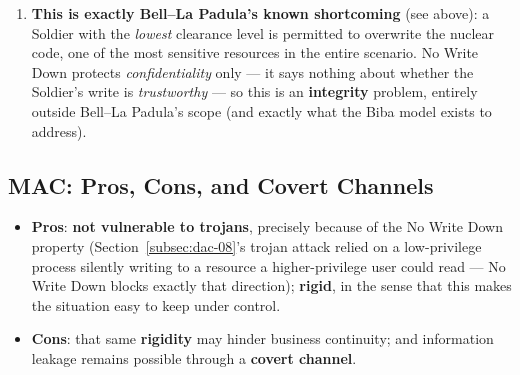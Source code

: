 \documentclass[12pt, a4paper]{article}
\begin{document}
\begin{enumerate}
    \item \textbf{This is exactly Bell--La Padula's known shortcoming} (see above): a Soldier with the \emph{lowest} clearance level is permitted to overwrite the nuclear code, one of the most sensitive resources in the entire scenario. No Write Down protects \emph{confidentiality} only --- it says nothing about whether the Soldier's write is \emph{trustworthy} --- so this is an \textbf{integrity} problem, entirely outside Bell--La Padula's scope (and exactly what the Biba model exists to address).
\end{enumerate}

\subsection{MAC: Pros, Cons, and Covert Channels}

\begin{itemize}
    \item \textbf{Pros}: \textbf{not vulnerable to trojans}, precisely because of the No Write Down property (Section~\ref{subsec:dac-08}'s trojan attack relied on a low-privilege process silently writing to a resource a higher-privilege user could read --- No Write Down blocks exactly that direction); \textbf{rigid}, in the sense that this makes the situation easy to keep under control.
    \item \textbf{Cons}: that same \textbf{rigidity} may hinder business continuity; and information leakage remains possible through a \textbf{covert channel}.
\end{itemize}
\end{document}
